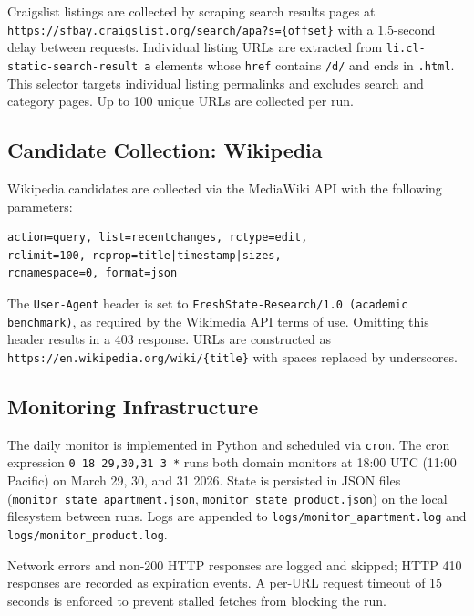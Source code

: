 Craigslist listings are collected by scraping search results pages at
\texttt{https://sfbay.craigslist.org/search/apa?s=\{offset\}} with a 1.5-second
delay between requests. Individual listing URLs are extracted from
\texttt{li.cl-static-search-result a} elements whose \texttt{href} contains
\texttt{/d/} and ends in \texttt{.html}. This selector targets individual listing
permalinks and excludes search and category pages. Up to 100 unique URLs are collected
per run.

\subsection{Candidate Collection: Wikipedia}
\label{app:wikipedia}

Wikipedia candidates are collected via the MediaWiki API with the following
parameters:
\begin{verbatim}
action=query, list=recentchanges, rctype=edit,
rclimit=100, rcprop=title|timestamp|sizes,
rcnamespace=0, format=json
\end{verbatim}
The \texttt{User-Agent} header is set to
\texttt{FreshState-Research/1.0 (academic benchmark)}, as required by the
Wikimedia API terms of use. Omitting this header results in a 403 response.
URLs are constructed as \texttt{https://en.wikipedia.org/wiki/\{title\}}
with spaces replaced by underscores.

\subsection{Monitoring Infrastructure}
\label{app:infra}

The daily monitor is implemented in Python and scheduled via \texttt{cron}.
The cron expression \texttt{0 18 29,30,31 3 *} runs both domain monitors at
18:00 UTC (11:00 Pacific) on March 29, 30, and 31 2026. State is persisted
in JSON files (\texttt{monitor\_state\_apartment.json},
\texttt{monitor\_state\_product.json}) on the local filesystem between runs.
Logs are appended to \texttt{logs/monitor\_apartment.log} and
\texttt{logs/monitor\_product.log}.

Network errors and non-200 HTTP responses are logged and skipped; HTTP 410
responses are recorded as expiration events. A per-URL request timeout of
15 seconds is enforced to prevent stalled fetches from blocking the run.
